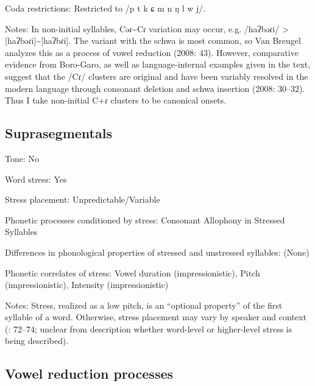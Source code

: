 {\begin{appendixdesc}
\item[Coda restrictions:] Restricted to /p t k ɕ m n ŋ l w j/. 

\item[Notes:] In non-initial syllables, Cəɾ{\textasciitilde}Cɾ variation may occur, e.g. /haʔbəɾi/ > [haʔbəɾi]{\textasciitilde}[haʔbɾi]. The variant with the schwa is most common, so Van Breugel analyzes this as a process of vowel reduction (2008: 43). However, comparative evidence from Boro-Garo, as well as language-internal examples given in the text, suggest that the /Cɾ/ clusters are original and have been variably resolved in the modern language through consonant deletion and schwa insertion (2008: 30--32). Thus I take non-initial C+ɾ clusters to be canonical onsets.
\end{appendixdesc}
\subsection*{Suprasegmentals}
\begin{appendixdesc}
\item[Tone:] No

\item[Word stress:] Yes

\item[Stress placement:] Unpredictable/Variable

\item[Phonetic processes conditioned by stress:] Consonant Allophony in Stressed Syllables

\item[Differences in phonological properties of stressed and unstressed syllables:] (None)

\item[Phonetic correlates of stress:] Vowel duration (impressionistic), Pitch (impressionistic), Intensity (impressionistic)

\item[Notes:] Stress, realized as a low pitch, is an “optional property” of the first syllable of a word. Otherwise, stress placement may vary by speaker and context (\citealt{VanBreugel2008}: 72--74; unclear from description whether word-level or higher-level stress is being described).
\end{appendixdesc}
\subsection*{Vowel reduction processes}
\begin{appendixdesc}


\end{appendixdesc}}
